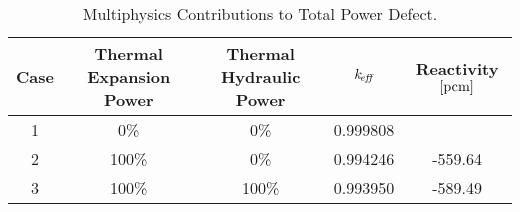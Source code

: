   \begin{table}
    \caption{Multiphysics Contributions to Total Power Defect.}
    \label{tab:multiphysics_worths}
    \centering
    \begin{tabular}{ccccc}
      \toprule
      Case & Thermal Expansion Power & Thermal Hydraulic Power & $k_{\!\mbox{\scriptsize \em eff}}$ & 
        Reactivity $\left[\text{{pcm}}\right]$ \\
      \midrule
      1 & 0\%   & 0\%   & 0.999808 & \\
      2 & 100\% & 0\%   & 0.994246 & -559.64 \\
      3 & 100\% & 100\% & 0.993950 & -589.49 \\
      \bottomrule
    \end{tabular}
  \end{table}
